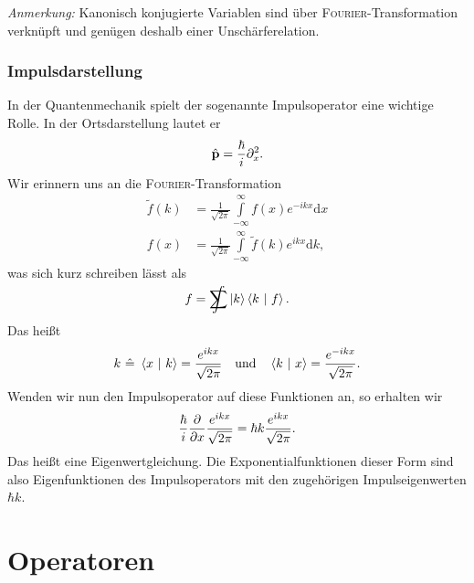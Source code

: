 \documentclass[a4paper,12pt,portrait]{book}
\numberwithin{equation}{section}
\begin{document}
\emph{Anmerkung:} Kanonisch konjugierte Variablen sind über \textsc{Fourier}-Transformation verknüpft und genügen deshalb einer Unschärferelation.

\subsubsection{Impulsdarstellung}

In der Quantenmechanik spielt der sogenannte Impulsoperator eine wichtige Rolle. In der Ortsdarstellung lautet er
\begin{equation*}
\hat{\textbf{p}} = \frac{\hbar}{i} \partial_x^2.
\end{equation*}
Wir erinnern uns an die \textsc{Fourier}-Transformation
\begin{align*}
\tilde{f}(k)&=\frac{1}{\sqrt{2\pi}}\int\limits_{-\infty}^\infty f(x)e^{-ikx}\mathrm{d}x \\
f(x)&=\frac{1}{\sqrt{2\pi}}\int\limits_{-\infty}^\infty \tilde{f}(k)e^{ikx}\mathrm{d}k,
\end{align*}
was sich kurz schreiben lässt als
\begin{equation*}
f = \SumInt\ket{k}\scap{k}{f}.
\end{equation*}
Das heißt
\begin{equation*}
k\ \hat{=}\ \left\langle x \ \middle| \ k\right\rangle = \frac{e^{ikx}}{\sqrt{2\pi}} \quad\text{und}\quad \left\langle k \ \middle| \ x\right\rangle = \frac{e^{-ikx}}{\sqrt{2\pi}}.
\end{equation*}
Wenden wir nun den Impulsoperator auf diese Funktionen an, so erhalten wir
\begin{equation*}
\frac{\hbar}{i}\frac{\partial{}}{\partial{x}}\frac{e^{ikx}}{\sqrt{2\pi}} = \hbar k \frac{e^{ikx}}{\sqrt{2\pi}}.
\end{equation*}
Das heißt eine Eigenwertgleichung. Die Exponentialfunktionen dieser Form sind also Eigenfunktionen des Impulsoperators mit den zugehörigen Impulseigenwerten $\hbar k$.

\section{Operatoren}
\end{document}
